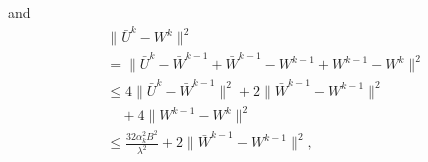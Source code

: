 and
\begin{align*}
& \|\bar{U}^k - W^k\|^2 \\
& = \|\bar{U}^k - \bar{W}^{k-1} + \bar{W}^{k-1} - W^{k-1} + W^{k-1} - W^k\|^2 \\
& \leq 4\|\bar{U}^k - \bar{W}^{k-1}\|^2 + 2\|\bar{W}^{k-1} - W^{k-1}\|^2 \\
& \quad + 4\|W^{k-1} - W^k\|^2 \\
& \leq \frac{32\alpha_k^2B^2}{\lambda^2} + 2\|\bar{W}^{k-1} - W^{k-1}\|^2,
\end{align*}
